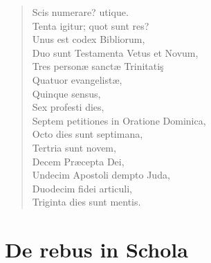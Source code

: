 \documentclass[12pt,  postvopaper]{memoir}
\begin{document}
\begin{verse}

  Scis numerare? utique.\\
  Tenta igitur; quot sunt res?\\
  Unus est codex Bibliorum,\\
  Duo sunt Testamenta Vetus et Novum,\\
  Tres personæ sanctæ Trinitatiş\\
  Quatuor evangelistæ,\\
  Quinque sensus,\\
  Sex profesti dies,\\
  Septem petitiones in Oratione Dominica,\\
  Octo dies sunt septimana,\\
  Tertria sunt novem,\\
  Decem Præcepta Dei,\\
  Undecim Apostoli dempto Juda,\\
  Duodecim fidei articuli,\\
  Triginta dies sunt mentis.\\
\end{verse}


\chapter{De rebus in Schola}
\end{document}
